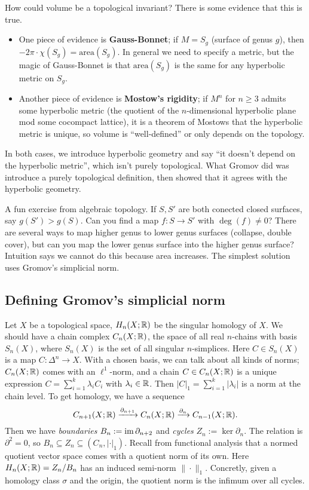 How could volume be a topological invariant? There is some evidence that this is true. 
\begin{itemize}
\setlength\itemsep{-.2em}
    \item One piece of evidence is \textbf{Gauss-Bonnet}; if $M=S_g$ (surface of genus $g$), then $-2 \pi \cdot \chi(S_g)=\mathrm{area}(S_g)$. In general we need to specify a metric, but the magic of Gauss-Bonnet is that $\mathrm{area}(S_g)$ is the same for any hyperbolic metric on $S_g$. 
    \item Another piece of evidence is \textbf{Mostow's rigidity}; if $M^n $ for $n \geq 3$ admits some hyperbolic metric (the quotient of the $n$-dimensional hyperbolic plane mod some cocompact lattice), it is a theorem of Mostows that the hyperbolic metric is unique, so volume is ``well-defined'' or only depends on the topology.
\end{itemize}
In both cases, we introduce hyperbolic geometry and say ``it doesn't depend on the hyperbolic metric'', which isn't purely topological. What Gromov did was introduce a purely topological definition, then showed that it agrees with the hyperbolic geometry.

A fun exercise from algebraic topology. If $S, S'$ are both conected closed surfaces, say $g(S') >g(S)$. Can you find a map $f \colon S \to S'$ with $\deg (f) \neq 0$? There are several ways to map higher genus to lower genus surfaces (collapse, double cover), but can you map the lower genus surface into the higher genus surface? Intuition says we cannot do this because area increases. The simplest solution uses Gromov's simplicial norm.

\subsection{Defining Gromov's simplicial norm}
Let $X$ be a topological space, $H_n (X;\mathbb{R})$ be the singular homology of $X$. We should have a chain complex $C_n (X;\mathbb{R})$, the space of all real $n$-chains with basis $S_n (X)$, where $S_n (X)$ is the set of all singular $n$-simplices. Here $C \in S_n (X)$ is a map $C \colon \Delta ^n  \to X$. With a chosen basis, we can talk about all kinds of norms; $C_n (X;\mathbb{R})$ comes with an $\ell^1$-norm, and a chain  $C \in C_n (X;\mathbb{R})$ is a unique expression $C=\sum_{i=1}^{k} \lambda_i C_i $ with $\lambda_i  \in \mathbb{R}$. Then $|C|_1=\sum_{i=1}^k |\lambda_i |$ is a norm at the chain level. To get homology, we have a sequence \[
    C_{n+1}(X; \mathbb{R}) \xrightarrow{\partial _{n+1}} C_n (X; \mathbb{R}) \xrightarrow{\partial _n } C_{n-1}(X;\mathbb{R}). 
\] Then we have \emph{boundaries} $B_n :=\operatorname{im} \partial _{n+2}$ and \emph{cycles} $Z_n :=\ker \partial _n $. The relation is $\partial ^2=0$, so $B_n \subseteq Z_n  \subseteq (C_n , |\cdot |_1)$. Recall from functional analysis that a normed quotient vector space comes with a quotient norm of its own. Here $H_n (X; \mathbb{R}) = Z_n  / B_n $ has an induced semi-norm $\| \cdot \|_1$. Concretly, given a homology class $\sigma$ and the origin, the quotient norm is the infimum over all cycles. 

